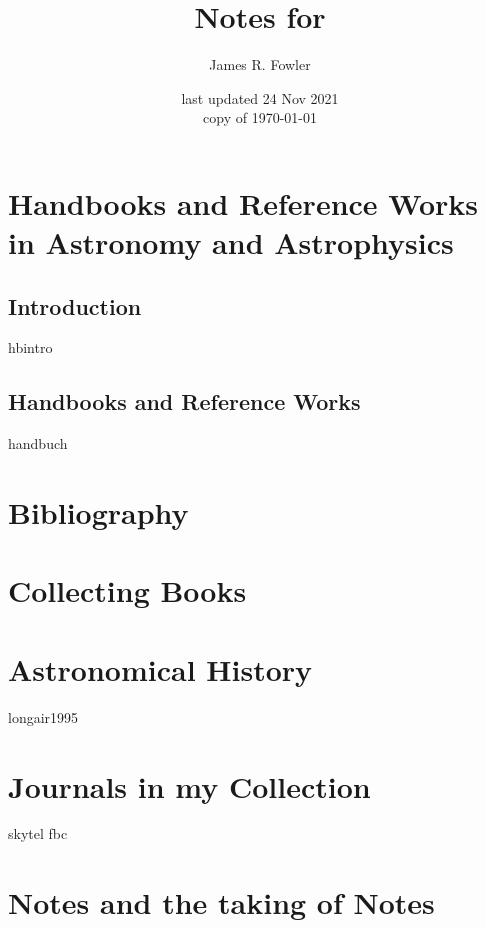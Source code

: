 \documentclass{book}
\begin{document}
\title{Notes for \ProjectTitle}
\author{James R. Fowler}
\date{last updated 24 Nov 2021\\ copy of \today}

\maketitle

\tableofcontents
\listoftables

\chapter{Handbooks and Reference Works in Astronomy and Astrophysics}
\section{Introduction}
{hbintro}

\section{Handbooks and Reference Works}
{handbuch}

\chapter{Bibliography}

\chapter{Collecting Books}

\chapter{Astronomical History}
{longair1995}

\chapter{Journals in my Collection}
{skytel}
{fbc}

\chapter{Notes and the taking of Notes}
\end{document}
